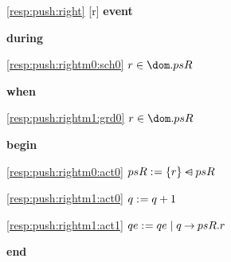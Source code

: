 \noindent \ref{resp:push:right} [r] \textbf{event}
\begin{block}
  \item   \textbf{during}
  \begin{block}
  \item[ \eqref{resp:push:rightm0:sch0} ]{$r \in \dom.psR $} %
  \end{block}
  \item   \textbf{when}
  \begin{block}
  \item[ \eqref{resp:push:rightm1:grd0} ]{$r \in \dom.psR $} %
  \end{block}
  \item   \textbf{begin}
  \begin{block}
  \item[ \eqref{resp:push:rightm0:act0} ]{$psR \mathrel{:\mkern1mu=} \{r\} \mathbin{\lhd\mkern-14mu-} psR $} %
  \item[ \eqref{resp:push:rightm1:act0} ]{$q \mathrel{:\mkern1mu=} q+1$} %
  \item[ \eqref{resp:push:rightm1:act1} ]{$qe \mathrel{:\mkern1mu=} qe \; | \; q \mathbin\rightarrow psR.r $} %
  \end{block}
  \item   \textbf{end} \\
\end{block}

